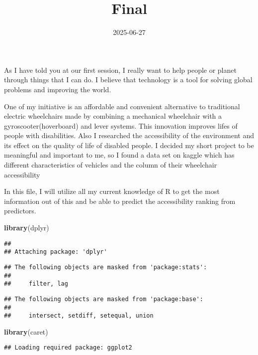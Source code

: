 \documentclass[
]{article}
\title{Final}
\author{}
\date{\vspace{-2.5em}2025-06-27}
\newenvironment{Shaded}{\begin{snugshade}}{\end{snugshade}}
\newcommand{\FunctionTok}[1]{\textcolor[rgb]{0.13,0.29,0.53}{\textbf{#1}}}
\newcommand{\NormalTok}[1]{#1}
\begin{document}
\maketitle

As I have told you at our first session, I really want to help people or
planet through things that I can do. I believe that technology is a tool
for solving global problems and improving the world.

One of my initiative is an affordable and convenient alternative to
traditional electric wheelchairs made by combining a mechanical
wheelchair with a gyroscooter(hoverboard) and lever systems. This
innovation improves lifes of people with disabilities. Also I researched
the accessibility of the environment and its effect on the quality of
life of disabled people. I decided my short project to be meaningful and
important to me, so I found a data set on kaggle which has different
characteristics of vehicles and the column of their wheelchair
accessibility

In this file, I will utilize all my current knowledge of R to get the
most information out of this and be able to predict the accessibility
ranking from predictors.

\begin{Shaded}
\begin{Highlighting}[]
\FunctionTok{library}\NormalTok{(dplyr)}
\end{Highlighting}
\end{Shaded}

\begin{verbatim}
## 
## Attaching package: 'dplyr'
\end{verbatim}

\begin{verbatim}
## The following objects are masked from 'package:stats':
## 
##     filter, lag
\end{verbatim}

\begin{verbatim}
## The following objects are masked from 'package:base':
## 
##     intersect, setdiff, setequal, union
\end{verbatim}

\begin{Shaded}
\begin{Highlighting}[]
\FunctionTok{library}\NormalTok{(caret)}
\end{Highlighting}
\end{Shaded}

\begin{verbatim}
## Loading required package: ggplot2
\end{verbatim}
\end{document}
